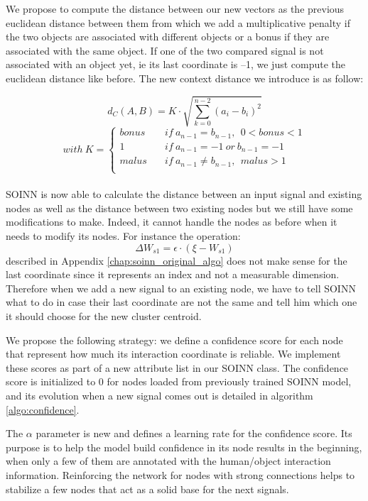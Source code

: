 We propose to compute the distance between our new vectors as the previous euclidean distance between them from which we add a multiplicative penalty if the two objects are associated with different objects or a bonus if they are associated with the same object. If one of the two compared signal is not associated with an object yet, ie its last coordinate is --1, we just compute the euclidean distance like before. The new context distance we introduce is as follow:

\begin{equation}
    d_C(A, B) = K\cdot \sqrt{\sum_{k=0}^{n-2}(a_i-b_i)^2} 
\end{equation}
\[
with~K =
\begin{cases}
    bonus &\quad if~a_{n-1}=b_{n-1},~~ 0 < bonus < 1 \\
    1 &\quad if~a_{n-1}=-1~or~b_{n-1}=-1 \\
    malus &\quad if~a_{n-1}\neq b_{n-1},~~ malus > 1 \\
\end{cases} 
\]
\\
SOINN is now able to calculate the distance between an input signal and existing nodes as well as the distance between two existing nodes but we still have some modifications to make. Indeed, it cannot handle the nodes as before when it needs to modify its nodes. For instance the operation:
\begin{equation}
    \Delta W_{s1} = \epsilon \cdot (\xi - W_{s1})
\end{equation}
described in Appendix \ref{chap:soinn_original_algo} does not make sense for the last coordinate since it represents an index and not a measurable dimension. Therefore when we add a new signal to an existing node, we have to tell SOINN what to do in case their last coordinate are not the same and tell him which one it should choose for the new cluster centroid. 

We propose the following strategy: we define a confidence score for each node that represent how much its interaction coordinate is reliable. We implement these scores as part of a new attribute list in our SOINN class. The confidence score is initialized to 0 for nodes loaded from previously trained SOINN model, and its evolution when a new signal comes out is detailed in algorithm \ref{algo:confidence}. 

The $\alpha$ parameter is new and defines a learning rate for the confidence score. Its purpose is to help the model build confidence in its node results in the beginning, when only a few of them are annotated with the human/object interaction information. Reinforcing the network for nodes with strong connections helps to stabilize a few nodes that act as a solid base for the next signals.

